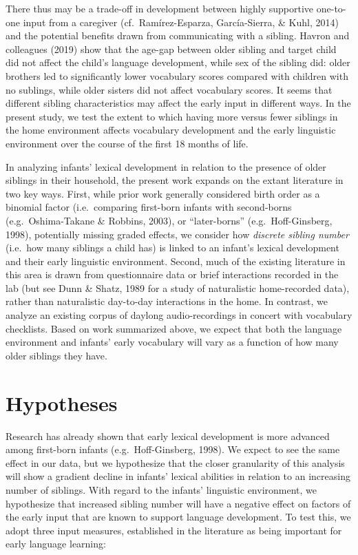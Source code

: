 \documentclass[
  english,
  man,floatsintext]{apa6}
\begin{document}
There thus may be a trade-off in development between highly supportive one-to-one input from a caregiver (cf.~Ramírez-Esparza, García-Sierra, \& Kuhl, 2014) and the potential benefits drawn from communicating with a sibling. Havron and colleagues (2019) show that the age-gap between older sibling and target child did not affect the child's language development, while sex of the sibling did: older brothers led to significantly lower vocabulary scores compared with children with no sublings, while older sisters did not affect vocabulary scores. It seems that different sibling characteristics may affect the early input in different ways. In the present study, we test the extent to which having more versus fewer siblings in the home environment affects vocabulary development and the early linguistic environment over the course of the first 18 months of life.

In analyzing infants' lexical development in relation to the presence of older siblings in their household, the present work expands on the extant literature in two key ways. First, while prior work generally considered birth order as a binomial factor (i.e.~comparing first-born infants with second-borns (e.g.~Oshima-Takane \& Robbins, 2003), or \enquote{later-borns} (e.g.~Hoff-Ginsberg, 1998), potentially missing graded effects, we consider how \emph{discrete sibling number} (i.e.~how many siblings a child has) is linked to an infant's lexical development and their early linguistic environment. Second, much of the existing literature in this area is drawn from questionnaire data or brief interactions recorded in the lab (but see Dunn \& Shatz, 1989 for a study of naturalistic home-recorded data), rather than naturalistic day-to-day interactions in the home. In contrast, we analyze an existing corpus of daylong audio-recordings in concert with vocabulary checklists. Based on work summarized above, we expect that both the language environment and infants' early vocabulary will vary as a function of how many older siblings they have.

\hypertarget{hypotheses}{%
\section{Hypotheses}\label{hypotheses}}

Research has already shown that early lexical development is more advanced among first-born infants (e.g.~Hoff-Ginsberg, 1998). We expect to see the same effect in our data, but we hypothesize that the closer granularity of this analysis will show a gradient decline in infants' lexical abilities in relation to an increasing number of siblings.
With regard to the infants' linguistic environment, we hypothesize that increased sibling number will have a negative effect on factors of the early input that are known to support language development. To test this, we adopt three input measures, established in the literature as being important for early language learning:
\end{document}
